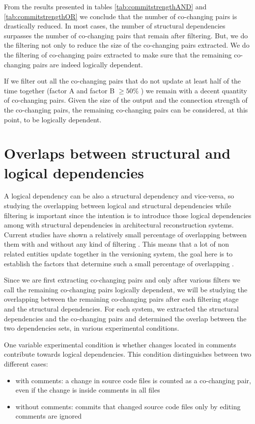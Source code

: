 From the results presented in tables \ref{tab:commitstrengthAND} and \ref{tab:commitstrengthOR} we conclude that the number of co-changing pairs is drastically reduced. In most cases, the number of structural dependencies surpasses the number of co-changing pairs that remain after filtering. But, we do the filtering not only to reduce the size of the co-changing pairs extracted. We do the filtering of co-changing pairs extracted to make sure that the remaining co-changing pairs are indeed logically dependent.

If we filter out all the co-changing pairs that do not update at least half of the time together (factor A and factor B $\geq 50 \%$ ) we remain with a decent quantity of co-changing pairs. Given the size of the output and the connection strength of the co-changing pairs, the remaining co-changing pairs can be considered, at this point, to be logically dependent. 




\section{Overlaps between structural and logical dependencies}
\label{sec:overlaps}

A logical dependency can be also a structural dependency and vice-versa, so studying the overlapping between logical and structural dependencies while filtering is important since the intention is to introduce those logical dependencies among with structural dependencies in architectural reconstruction systems. Current studies have shown a relatively small percentage of overlapping between them with and without any kind of filtering \cite{DBLP:journals/jss/AjienkaC17}. This means that a lot of non related entities update together in the versioning system, the goal here is to establish the factors that determine such a small percentage of overlapping \cite{enase19}.

Since we are first extracting co-changing pairs and only after various filters we call the remaining co-changing pairs logically dependent, we will be studying the overlapping between the remaining co-changing pairs after each filtering stage and the structural dependencies. 
For each system, we extracted the structural dependencies and the co-changing pairs and determined the overlap between the two dependencies sets, in various experimental conditions. 

One variable experimental condition is whether changes located in comments contribute towards logical dependencies. This condition distinguishes between two different cases: 
\begin{itemize}
	\item with comments: a change in source code files is counted as a co-changing pair, even if the change is inside comments in all files
	\item without comments: commits that changed source code files only by editing comments are ignored
\end{itemize}

